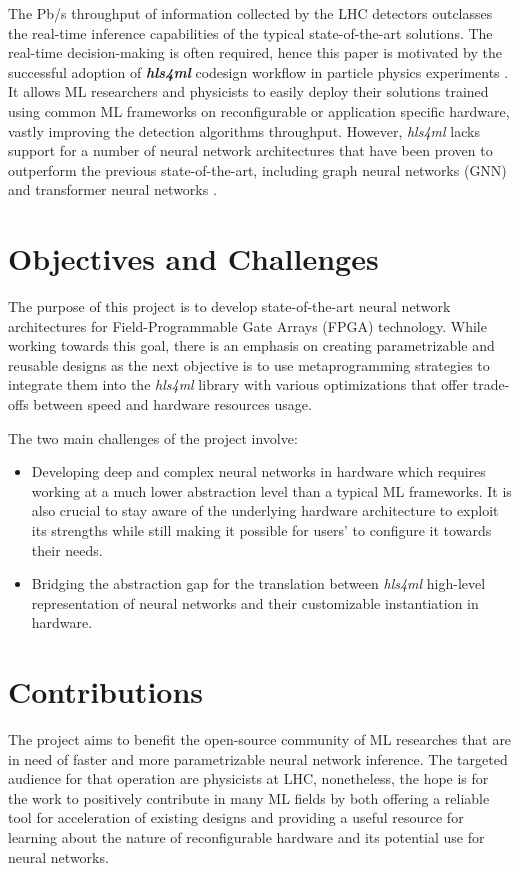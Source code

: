 The Pb/s throughput of information collected by the LHC detectors outclasses the real-time inference capabilities of the typical state-of-the-art solutions. The real-time decision-making is often required, hence this paper is motivated by the successful adoption of  \textit{\textbf{hls4ml}} codesign workflow in particle physics experiments \cite{8-fahim2021hls4ml:}. It allows ML researchers and physicists to easily deploy their solutions trained using common ML frameworks on reconfigurable or application specific hardware, vastly improving the detection algorithms throughput. However, \textit{hls4ml} lacks support for a number of neural network architectures that have been proven to outperform the previous state-of-the-art, including graph neural networks (GNN) \cite{9-newman2019jedi-net:, 11-elabd2021graph} and transformer neural networks \cite{3-yuan2021constituentnet:}.


\section{Objectives and Challenges}
The purpose of this project is to develop state-of-the-art neural network architectures for Field-Programmable Gate Arrays (FPGA) technology. While working towards this goal, there is an emphasis on creating parametrizable and reusable designs as the next objective is to use metaprogramming strategies to integrate them into the \textit{hls4ml} library with various optimizations that offer trade-offs between speed and hardware resources usage.

The two main challenges of the project involve:
\begin{itemize}
  \item Developing deep and complex neural networks in hardware which requires working at a much lower abstraction level than a typical ML frameworks. It is also crucial to stay aware of the underlying hardware architecture to exploit its strengths while still making it possible for users' to configure it towards their needs.
  \item Bridging the abstraction gap for the translation between \textit{hls4ml} high-level representation of neural networks and their customizable instantiation in hardware.
\end{itemize}


\section{Contributions}
The project aims to benefit the open-source community of ML researches that are in need of faster and more parametrizable neural network inference. The targeted audience for that operation are physicists at LHC, nonetheless, the hope is for the work to positively contribute in many ML fields by both offering a reliable tool for acceleration of existing designs and providing a useful resource for learning about the nature of reconfigurable hardware and its potential use for neural networks.

